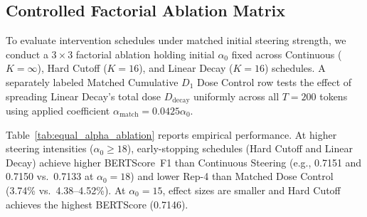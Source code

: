 \documentclass[conference]{IEEEtran}
\begin{document}
\subsection{Controlled Factorial Ablation Matrix}
To evaluate intervention schedules under matched initial steering strength, we conduct a $3\times 3$ factorial ablation holding initial $\alpha_0$ fixed across Continuous ($K=\infty$), Hard Cutoff ($K=16$), and Linear Decay ($K=16$) schedules. A separately labeled Matched Cumulative $D_1$ Dose Control row tests the effect of spreading Linear Decay's total dose $D_{\text{decay}}$ uniformly across all $T=200$ tokens using applied coefficient $\alpha_{\text{match}} = 0.0425 \alpha_0$.

Table~\ref{tab:equal_alpha_ablation} reports empirical performance. At higher steering intensities ($\alpha_0 \ge 18$), early-stopping schedules (Hard Cutoff and Linear Decay) achieve higher BERTScore~F1 than Continuous Steering (e.g., 0.7151 and 0.7150 vs.\ 0.7133 at $\alpha_0=18$) and lower Rep-4 than Matched Dose Control (3.74\% vs.\ 4.38--4.52\%). At $\alpha_0=15$, effect sizes are smaller and Hard Cutoff achieves the highest BERTScore (0.7146).
\end{document}
